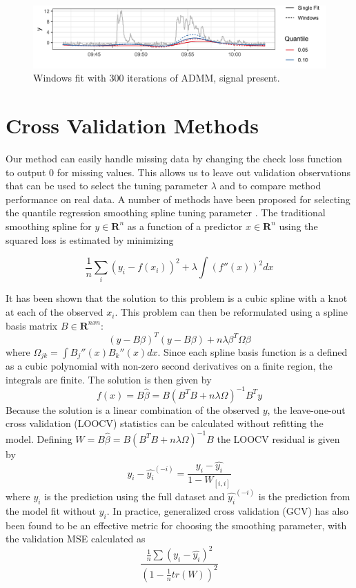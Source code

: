 \documentclass[12pt]{article}
\numberwithin{equation}{section}
\theoremstyle{plain}
\begin{document}
\begin{figure}[!h] 
	\caption{Windows fit with 300 iterations of ADMM, signal present.}
	\includegraphics[width = \linewidth]{admm_windows2.png}
\end{figure}

\pagebreak

\section {Cross Validation Methods}
Our method can easily handle missing data by changing the check loss function to output 0 for missing values. This allows us to leave out validation observations that can be used to select the tuning parameter $\lambda$ and to compare method performance on real data. A number of methods have been proposed for selecting the quantile regression smoothing spline tuning parameter \cite{yuan2006gacv}. The traditional smoothing spline for $y \in \mathbf{R}^n$ as a function of a predictor $x \in \mathbf{R}^n$ using the squared loss is estimated by minimizing 

\begin{equation}
\frac{1}{n}\sum_i (y_i - f(x_i))^2 + \lambda \int(f''(x))^2 dx
\end{equation}

It has been shown that the solution to this problem is a cubic spline with a knot at each of the observed $x_i$. This problem can then be reformulated using a spline basis matrix $B \in \mathbf{R}^{nxn}$: 
\begin{equation}
(y-B\beta)^T(y-B\beta) + n\lambda\beta^T\Omega\beta
\end{equation}  
where $\Omega_{jk} = \int B_j''(x)B_k''(x)dx$. Since each spline basis function is a defined as a cubic polynomial with non-zero second derivatives on a finite region, the integrals are finite. The solution is then given by 
$$f(x) = B\widehat{\beta} = B(B^TB + n\lambda\Omega)^{-1}B^Ty$$
Because the solution is a linear combination of the observed $y$, the leave-one-out cross validation (LOOCV) statistics can be calculated without refitting the model. Defining $W = B\widehat{\beta} = B(B^TB + n\lambda\Omega)^{-1}B$ the LOOCV residual is given by 
\begin{equation}
y_i - \widehat{y_i}^{(-i)} = \frac{y_i - \widehat{y_i}}{1-W_{[i,i]}}
\end{equation}
where $\widehat{y_i}$ is the prediction using the full dataset and $\widehat{y_i}^{(-i)}$ is the prediction from the model fit without $y_i$. In practice, generalized cross validation (GCV) has also been found to be an effective metric for choosing the smoothing parameter, with the validation MSE calculated as 
\begin{equation}
\frac{\frac{1}{n}\sum(y_i-\widehat{y_i})^2}{(1-\frac{1}{n}tr(W))^2}
\end{equation}
\end{document}
